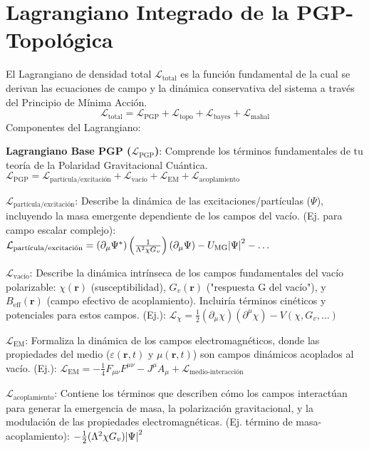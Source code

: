 \documentclass{book}
\begin{document}
\section{Lagrangiano Integrado de la PGP-Topológica}
El Lagrangiano de densidad total $\mathcal{L}_{\text{total}}$ es la función fundamental de la cual se derivan las ecuaciones de campo y la dinámica conservativa del sistema a través del Principio de Mínima Acción.
\begin{equation}
    \mathcal{L}_{\text{total}}=\mathcal{L}_{\text{PGP}}+\mathcal{L}_{\text{topo}}+\mathcal{L}_{\text{bayes}}+\mathcal{L}_{\text{mahal}}
\end{equation}
Componentes del Lagrangiano:

\textbf{Lagrangiano Base PGP ($\mathcal{L}_{\text{PGP}}$)}: Comprende los términos fundamentales de tu teoría de la Polaridad Gravitacional Cuántica.
$\mathcal{L}_{\text{PGP}}=\mathcal{L}_{\text{partícula/excitación}}+\mathcal{L}_{\text{vacío}}+\mathcal{L}_{\text{EM}}+\mathcal{L}_{\text{acoplamiento}}$

$\mathcal{L}_{\text{partícula/excitación}}$: Describe la dinámica de las excitaciones/partículas ($\Psi$), incluyendo la masa emergente dependiente de los campos del vacío. (Ej. para campo escalar complejo):
$\mathcal{L}_{\text{partícula/excitación}}=(\partial_\mu\Psi^*)\left(\frac{1}{\Lambda^2\chi G_v}\right)(\partial_\mu\Psi)-U_{\text{MG}}\abs{\Psi}^2-\ldots$

$\mathcal{L}_{\text{vacío}}$: Describe la dinámica intrínseca de los campos fundamentales del vacío polarizable: $\chi(\mathbf{r})$ (susceptibilidad), $G_v(\mathbf{r})$ ("respuesta G del vacío"), y $B_{\text{eff}}(\mathbf{r})$ (campo efectivo de acoplamiento). Incluiría términos cinéticos y potenciales para estos campos. (Ej.):
$\mathcal{L}_\chi=\frac{1}{2}(\partial_\mu\chi)(\partial^\mu\chi)-V(\chi,G_v,\ldots)$

$\mathcal{L}_{\text{EM}}$: Formaliza la dinámica de los campos electromagnéticos, donde las propiedades del medio ($\varepsilon(\mathbf{r},t)$ y $\mu(\mathbf{r},t)$) son campos dinámicos acoplados al vacío. (Ej.):
$\mathcal{L}_{\text{EM}}=-\frac{1}{4}F_{\mu\nu}F^{\mu\nu}-J^\mu A_\mu+\mathcal{L}_{\text{medio-interacción}}$

$\mathcal{L}_{\text{acoplamiento}}$: Contiene los términos que describen cómo los campos interactúan para generar la emergencia de masa, la polarización gravitacional, y la modulación de las propiedades electromagnéticas. (Ej. término de masa-acoplamiento): $-\frac{1}{2}(\Lambda^2\chi G_v)\abs{\Psi}^2$
\end{document}
